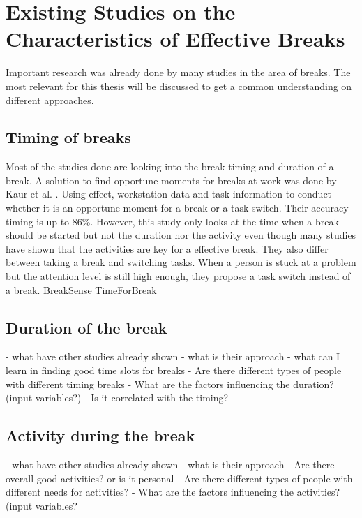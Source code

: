 \documentclass{hasel_thesis}
\begin{document}
\section{Existing Studies on the Characteristics of Effective Breaks}
Important research was already done by many studies in the area of breaks. The most relevant for this thesis will be discussed to get a common understanding on different approaches.

\subsection{Timing of breaks}
Most of the studies done are looking into the break timing and duration of a break. A solution to find opportune moments for breaks at work was done by Kaur et al. \cite{Kaur.2020}. Using effect, workstation data and task information to conduct whether it is an opportune moment for a break or a task switch. Their accuracy timing is up to 86\%. However, this study only looks at the time when a break should be started but not the duration nor the activity even though many studies have shown that the activities are key for a effective break. They also differ between taking a break and switching tasks. When a person is stuck at a problem but the attention level is still high enough, they propose a task switch instead of a break.
BreakSense
TimeForBreak

\subsection{Duration of the break}
- what have other studies already shown
- what is their approach
- what can I learn in finding good time slots for breaks
- Are there different types of people with different timing breaks
- What are the factors influencing the duration? (input variables?)
- Is it correlated with the timing?

\subsection{Activity during the break}
- what have other studies already shown
- what is their approach
- Are there overall good activities? or is it personal
- Are there different types of people with different needs for activities?
- What are the factors influencing the activities? (input variables?
\end{document}

